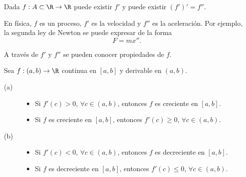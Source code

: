 Dada $\displaystyle f : A \subset \R \to \R $ puede existir $\displaystyle f' $ y puede existir $\displaystyle \left(f'\right)' = f'' $. 
\begin{observation}
\normalfont En física, $\displaystyle f $ es un proceso, $\displaystyle f' $ es la velocidad y $\displaystyle f'' $ es la aceleración. Por ejemplo, la segunda ley de Newton se puede expresar de la forma 
\[ F = m x'' .\]
\end{observation}
A través de $\displaystyle f' $ y $\displaystyle f'' $ se pueden conocer propiedades de $\displaystyle f $. 
\begin{ftheorem}[]
	\normalfont Sea $\displaystyle f : \left(a,b\right) \to \R $ continua en $\displaystyle [a,b] $ y derivable en $\displaystyle \left(a,b\right) $. 
\begin{description}
	\item[(a)] 
		\begin{itemize}
			\item Si $\displaystyle f'\left(c\right) > 0 $, $\displaystyle \forall c \in \left(a,b\right) $, entonces $\displaystyle f $ es creciente en $\displaystyle [a,b] $.
			\item Si $\displaystyle f $ es creciente en $\displaystyle [a,b] $, entonces $\displaystyle f'\left(c\right) \geq 0 $, $\displaystyle \forall c \in \left(a,b\right) $.
		\end{itemize}
		
	\item[(b)] 
		\begin{itemize}
			\item Si $\displaystyle f'\left(c\right) < 0 $, $\displaystyle \forall c \in \left(a,b\right) $, entonces $\displaystyle f $ es decreciente en $\displaystyle [a,b] $.
			\item Si $\displaystyle f $ es decreciente en $\displaystyle [a,b] $, entonces $\displaystyle f'\left(c\right) \leq 0 $, $\displaystyle \forall c \in \left(a,b\right) $.
		\end{itemize}
\end{description}
\end{ftheorem}
